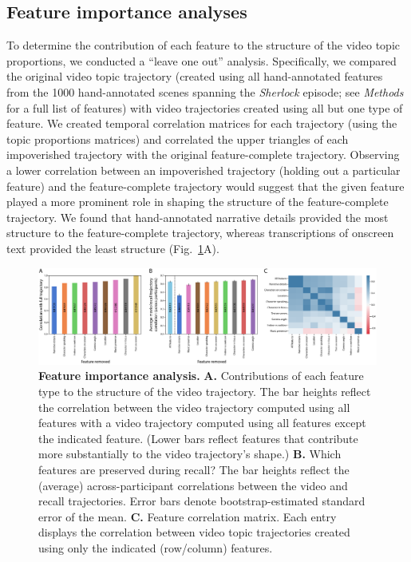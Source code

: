 \documentclass{article}
\begin{document}
\subsection*{Feature importance analyses}
To determine the contribution of each feature to the structure of the video topic proportions, we conducted a ``leave one out'' analysis.  Specifically, we compared the original video topic trajectory (created using all hand-annotated features from the 1000 hand-annotated scenes spanning the \textit{Sherlock} episode; see \textit{Methods} for a full list of features) with video trajectories created using all but one type of feature.  We created temporal correlation matrices for each trajectory (using the topic proportions matrices) and correlated the upper triangles of each impoverished trajectory with the original feature-complete trajectory.  Observing a lower correlation between an impoverished trajectory (holding out a particular feature) and the feature-complete trajectory would suggest that the given feature played a more prominent role in shaping the structure of the feature-complete trajectory.  We found that hand-annotated narrative details provided the most structure to the feature-complete trajectory, whereas transcriptions of onscreen text provided the least structure (Fig.~\ref{fig:feature-importance}A).

\begin{figure}[tb]
\centering
\includegraphics[width=1\textwidth]{figs/feature_value}
\caption{\small \textbf{Feature importance analysis.} \textbf{A.} Contributions of each feature type to the structure of the video trajectory. The bar heights reflect the correlation between the video trajectory computed using all features with a video trajectory computed using all features except the indicated feature.  (Lower bars reflect features that contribute more substantially to the video trajectory's shape.) \textbf{B.} Which features are preserved during recall?  The bar heights reflect the (average) across-participant correlations between the video and recall trajectories.  Error bars denote bootstrap-estimated standard error of the mean.  \textbf{C.} Feature correlation matrix.  Each entry displays the correlation between video topic trajectories created using only the indicated (row/column) features.}
\label{fig:feature-importance}
\end{figure}
\end{document}
